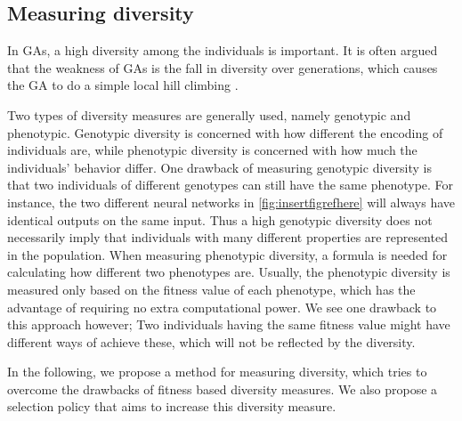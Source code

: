 \subsection{Measuring diversity}
In GAs, a high diversity among the individuals is important. It is often argued that the weakness of GAs is the fall in diversity over generations, which causes the GA to do a simple local hill climbing \citpls{}.

Two types of diversity measures are generally used, namely genotypic and phenotypic\cite{Nguyen:2006:ASPGP}. Genotypic diversity is concerned with how different the encoding of individuals are, while phenotypic diversity is concerned with how much the individuals' behavior differ. One drawback of measuring genotypic diversity is that two individuals of different genotypes can still have the same phenotype. For instance, the two different neural networks in \cref{fig:insertfigrefhere} will always have identical outputs on the same input. Thus a high genotypic diversity does not necessarily imply that individuals with many different properties are represented in the population.
%
%
When measuring phenotypic diversity, a formula is needed for calculating how different two phenotypes are.
Usually, the phenotypic diversity is measured only based on the fitness value of each phenotype\cite{Nguyen:2006:ASPGP}, which has the advantage of requiring no extra computational power. 
We see one drawback to this approach however; Two individuals having the same fitness value might have different ways of achieve these, which will not be reflected by the diversity. 

In the following, we propose a method for measuring diversity, which tries to overcome the drawbacks of fitness based diversity measures.
We also propose a selection policy that aims to increase this diversity measure.
